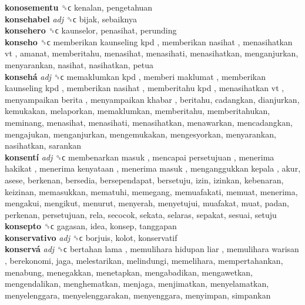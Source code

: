 \textbf{konosementu} ␝ϲ  kenalan, pengetahuan  \\
\textbf{konsehabel} \emph{adj}  ␝ϲ  bijak, sebaiknya  \\
\textbf{konsehero} ␝ϲ  kaunselor, penasihat, perunding  \\
\textbf{konseho} ␝ϲ   memberikan kaunseling kpd ,  memberikan nasihat ,  menasihatkan vt , amanat, memberitahu, menasihat, menasihati, menasihatkan, menganjurkan, menyarankan, nasihat, nasihatkan, petua  \\
\textbf{konsehá} \emph{adj}  ␝ϲ   memaklumkan kpd ,  memberi maklumat ,  memberikan kaunseling kpd ,  memberikan nasihat ,  memberitahu kpd ,  menasihatkan vt ,  menyampaikan berita ,  menyampaikan khabar , beritahu, cadangkan, dianjurkan, kemukakan, melaporkan, memaklumkan, memberitahu, memberitahukan, meminang, menasihat, menasihati, menasihatkan, menawarkan, mencadangkan, mengajukan, menganjurkan, mengemukakan, mengesyorkan, menyarankan, nasihatkan, sarankan  \\
\textbf{konsentí} \emph{adj}  ␝ϲ   membenarkan masuk ,  mencapai persetujuan ,  menerima hakikat ,  menerima kenyataan ,  menerima masuk ,  menganggukkan kepala , akur, asese, berkenan, bersedia, bersependapat, bersetuju, izin, izinkan, kebenaran, keizinan, memasukkan, mematuhi, memegang, memuafakati, memuat, menerima, mengakui, mengikut, menurut, menyerah, menyetujui, muafakat, muat, padan, perkenan, persetujuan, rela, secocok, sekata, selaras, sepakat, sesuai, setuju  \\
\textbf{konsepto} ␝ϲ  gagasan, idea, konsep, tanggapan  \\
\textbf{konservativo} \emph{adj}  ␝ϲ  borjuis, kolot, konservatif  \\
\textbf{konservá} \emph{adj}  ␝ϲ   bertahan lama ,  memulihara hidupan liar ,  memulihara warisan , berekonomi, jaga, melestarikan, melindungi, memelihara, mempertahankan, menabung, menegakkan, menetapkan, mengabadikan, mengawetkan, mengendalikan, menghematkan, menjaga, menjimatkan, menyelamatkan, menyelenggara, menyelenggarakan, menyenggara, menyimpan, simpankan  \\
